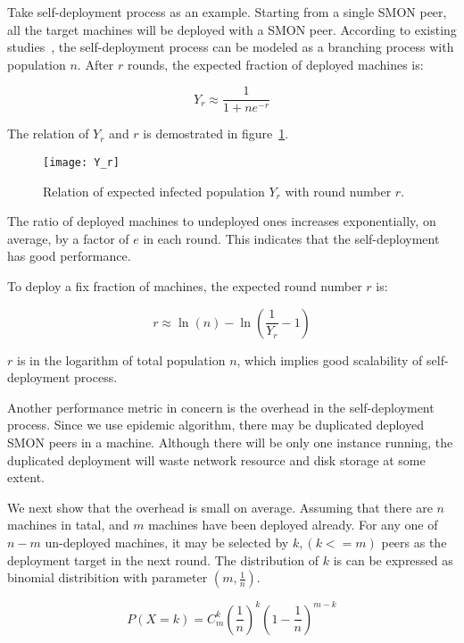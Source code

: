 Take self-deployment process as an example. Starting from a
single SMON peer, all the target machines will be deployed
with a SMON peer.  According to existing
studies~\cite{Eugster2004}, the self-deployment process can
be modeled as a branching process with population $n$. After
$r$ rounds, the expected fraction of deployed machines is:

\begin{equation*}
Y_r \approx \frac{1}{1+ne^{-r}} 
\end{equation*}

The relation of $Y_r$ and $r$ is demostrated in
figure~\ref{fig:yr}.

\begin{figure}
\centering
\texttt{[image: Y\_r]}
\caption{Relation of expected infected population $Y_r$ with
round number $r$.}
\label{fig:yr}
\end{figure}


The ratio of deployed machines to undeployed ones increases
exponentially, on average, by a factor of $e$ in each round.
This indicates that the self-deployment has good
performance.

To deploy a fix fraction of machines, the expected round
number $r$ is:

\begin{equation*}
r \approx \ln(n) - \ln(\frac{1}{Y_r} - 1)
\end{equation*}

$r$ is in the logarithm of total population $n$, which
implies good scalability of self-deployment process.


Another performance metric in concern is the overhead in
the self-deployment process. Since we use epidemic
algorithm, there may be duplicated deployed SMON peers in a
machine. Although there will be only one instance running,
the duplicated deployment will waste network resource and
disk storage at some extent.

We next show that the overhead is small on average. Assuming
that there are $n$ machines in tatal, and $m$ machines have
been deployed already. For any one of $n-m$ un-deployed
machines, it may be selected by $k, (k <= m)$ peers as the
deployment target in the next round.  The distribution of
$k$ is can be expressed as binomial distribition with
parameter $(m, \frac{1}{n})$.

\begin{equation*}
P(X=k) = C_m^k (\frac{1}{n})^k (1 - \frac{1}{n})^{m - k}
\end{equation*}

